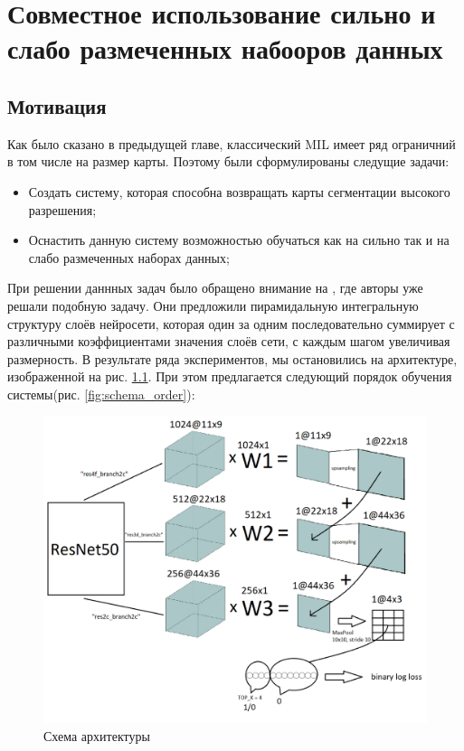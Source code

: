 \chapter{Совместное использование сильно и слабо размеченных набооров данных} \label{chapt3}

\section{Мотивация} \label{sect3_1}

Как было сказано в предыдущей главе, классический MIL имеет ряд ограничний в том числе на размер карты. Поэтому были сформулированы следущие задачи:

\begin{itemize}
    \item Создать систему, которая способна возвращать карты сегментации высокого разрешения;
    \item Оснастить данную систему возможностью обучаться как на сильно так и на слабо размеченных наборах данных;
\end{itemize}

При решении даннных задач было обращено внимание на \cite{rongchang_weakly-supervised_2018}, где авторы уже решали подобную задачу. Они предложили пирамидальную интегральную структуру слоёв нейросети, которая один за одним последовательно суммирует с различными коэффициентами значения слоёв сети, с каждым шагом увеличивая размерность. В результате ряда экспериментов, мы остановились на архитектуре, изображенной на рис. \ref{fig:schema_total}. При этом предлагается следующий порядок обучения системы(рис. \ref{fig:schema_order}):

\begin{figure}[h] 
  \center
  \includegraphics [scale=0.64] {images/schema_total.png}
  \caption{Схема архитектуры} 
  \label{fig:schema_total}  
\end{figure}


